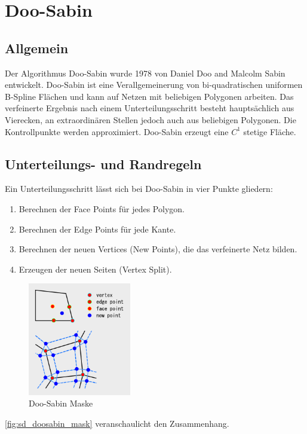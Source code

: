 \section{Doo-Sabin} \label{sec:doosabin}

\subsection{Allgemein}

Der Algorithmus Doo-Sabin wurde 1978 von Daniel Doo and Malcolm Sabin entwickelt.
Doo-Sabin ist eine Verallgemeinerung von bi-quadratischen uniformen B-Spline Flächen
und kann auf Netzen mit beliebigen Polygonen arbeiten.
Das verfeinerte Ergebnis nach einem Unterteilungsschritt besteht hauptsächlich
aus Vierecken, an extraordinären Stellen jedoch auch aus beliebigen Polygonen.
Die Kontrollpunkte werden approximiert.
Doo-Sabin erzeugt eine \(C^1\) stetige Fläche.
\cite[S. 79f]{Zorin.subdivcourse}

\subsection{Unterteilungs- und Randregeln}

Ein Unterteilungsschritt lässt sich bei Doo-Sabin in vier Punkte gliedern:
\begin{enumerate}
\item Berechnen der Face Points für jedes Polygon.
\item Berechnen der Edge Points für jede Kante.
\item Berechnen der neuen Vertices (New Points), die das verfeinerte Netz bilden.
\item Erzeugen der neuen Seiten (Vertex Split).
\end{enumerate}

\begin{figure}
\centering
\includegraphics[width=0.4\textwidth]{content/media/sd_doosabin_mask.png}
\caption{Doo-Sabin Maske \cite{Yoshihitoyagi.doosabin}}
\label{fig:sd_doosabin_mask}
\end{figure}
\autoref{fig:sd_doosabin_mask} veranschaulicht den Zusammenhang.

